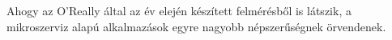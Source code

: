 Ahogy az \foreignlanguage{british}{O'Really} által az év elején készített felmérésből \cite{OReally} is látszik, a mikroszerviz alapú alkalmazások egyre nagyobb népszerűségnek örvendenek.